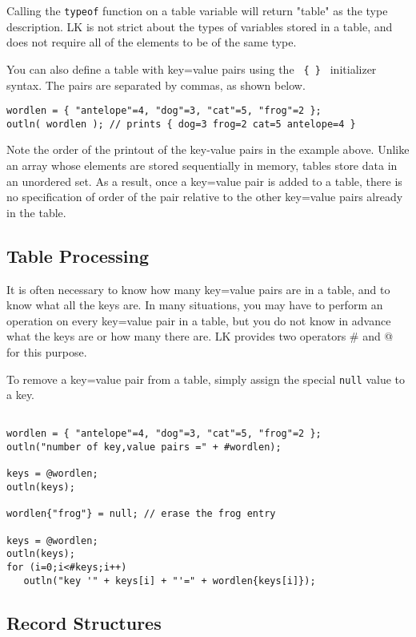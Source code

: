\documentclass{article}
\begin{document}
Calling the \texttt{typeof} function on a table variable will return "table" as the type description.  LK is not strict about the types of variables stored in a table, and does not require all of the elements to be of the same type.

You can also define a table with key=value pairs using the \texttt{ \{ \} } initializer syntax.  The pairs are separated by commas, as shown below.

\begin{verbatim}
wordlen = { "antelope"=4, "dog"=3, "cat"=5, "frog"=2 };
outln( wordlen ); // prints { dog=3 frog=2 cat=5 antelope=4 }
\end{verbatim}

Note the order of the printout of the key-value pairs in the example above.  Unlike an array whose elements are stored sequentially in memory, tables store data in an unordered set.  As a result, once a key=value pair is added to a table, there is no specification of order of the pair relative to the other key=value pairs already in the table.

\subsection{Table Processing}

It is often necessary to know how many key=value pairs are in a table, and to know what all the keys are.  In many situations, you may have to perform an operation on every key=value pair in a table, but you do not know in advance what the keys are or how many there are.  LK provides two operators \# and @ for this purpose.

To remove a key=value pair from a table, simply assign the special \texttt{null} value to a key.

\begin{verbatim}

wordlen = { "antelope"=4, "dog"=3, "cat"=5, "frog"=2 };
outln("number of key,value pairs =" + #wordlen);

keys = @wordlen;
outln(keys);

wordlen{"frog"} = null; // erase the frog entry

keys = @wordlen;
outln(keys);
for (i=0;i<#keys;i++)
   outln("key '" + keys[i] + "'=" + wordlen{keys[i]});

\end{verbatim}

\subsection{Record Structures}
\end{document}

